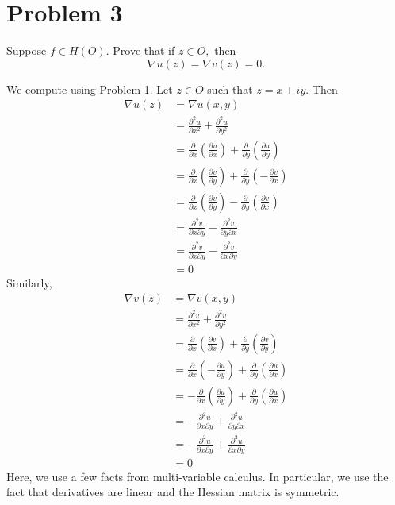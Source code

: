\documentclass[11pt]{article}
\begin{document}
\section*{Problem 3}
\begin{problem}
    Suppose $f \in H(O).$ Prove that if $z\in O,$ then
    \[\nabla  u(z) = \nabla v(z) = 0.\]
\end{problem}
\begin{solution}
    We compute using Problem 1. Let $z\in O$ such that $z = x + iy.$ Then
    \begin{align*}
        \nabla  u(z)  &= \nabla u(x,y)\\
        &= \frac{\partial^2 u}{\partial x^2} + \frac{\partial ^2 u}{\partial y^2}\\
        &= \frac{\partial}{\partial x}(\frac{\partial u}{\partial x}) + \frac{\partial}{\partial y}(\frac{\partial u}{\partial y})\\
        &= \frac{\partial}{\partial x}(\frac{\partial v}{\partial y}) + \frac{\partial}{\partial y}(-\frac{\partial v}{\partial x})\\
        &= \frac{\partial}{\partial x}(\frac{\partial v}{\partial y}) - \frac{\partial}{\partial y}(\frac{\partial v}{\partial x})\\
        &= \frac{\partial^2 v}{\partial x \partial y} - \frac{\partial^2 v}{\partial y\partial x}\\
        &= \frac{\partial^2 v}{\partial x \partial y} - \frac{\partial^2 v}{\partial x\partial y}\\
        &= 0
    \end{align*}
    Similarly,
    \begin{align*}
        \nabla  v(z)  &= \nabla v(x,y)\\
        &= \frac{\partial^2 v}{\partial x^2} + \frac{\partial ^2 v}{\partial y^2}\\
        &= \frac{\partial}{\partial x}(\frac{\partial v}{\partial x}) + \frac{\partial}{\partial y}(\frac{\partial v}{\partial y})\\
        &= \frac{\partial}{\partial x}(-\frac{\partial u}{\partial y}) + \frac{\partial}{\partial y}(\frac{\partial u}{\partial x})\\
        &= -\frac{\partial}{\partial x}(\frac{\partial u}{\partial y}) + \frac{\partial}{\partial y}(\frac{\partial u}{\partial x})\\
        &=-\frac{\partial^2 u}{\partial x\partial y} + \frac{\partial^2 u}{\partial y\partial x}\\
        &= -\frac{\partial^2 u}{\partial x\partial y} + \frac{\partial^2 u}{\partial x\partial y}\\
        &= 0
    \end{align*}
Here, we use a few facts from multi-variable calculus. In particular, we use the fact that derivatives are linear and the Hessian matrix is symmetric.
\end{solution}
\end{document}
